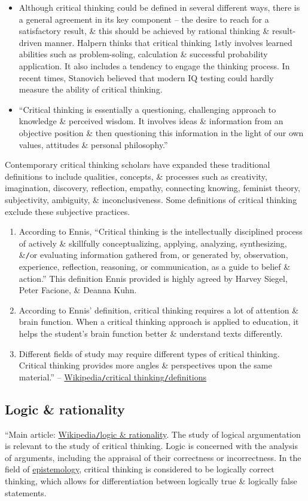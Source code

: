 \documentclass[oneside]{book}
\numberwithin{equation}{section}
\begin{document}
\begin{itemize}
	\item Although critical thinking could be defined in several different ways, there is a general agreement in its key component -- the desire to reach for a satisfactory result, \&  this should be achieved by rational thinking \& result-driven manner. Halpern thinks that critical thinking 1stly involves learned abilities such as problem-soling, calculation \& successful probability application. It also includes a tendency to engage the thinking process. In recent times, Stanovich believed that modern IQ testing could hardly measure the ability of critical thinking.
	\item ``Critical thinking is essentially a questioning, challenging approach to knowledge \& perceived wisdom. It involves ideas \& information from an objective position \& then questioning this information in the light of our own values, attitudes \& personal philosophy.''
\end{itemize}
Contemporary critical thinking scholars have expanded these traditional definitions to include qualities, concepts, \& processes such as creativity, imagination, discovery, reflection, empathy, connecting knowing, feminist theory, subjectivity, ambiguity, \& inconclusiveness. Some definitions of critical thinking exclude these subjective practices.
\begin{enumerate}
	\item According to Ennis, ``Critical thinking is the intellectually disciplined process of actively \& skillfully conceptualizing, applying, analyzing, synthesizing, \&\texttt{/}or evaluating information gathered from, or generated by, observation, experience, reflection, reasoning, or communication, as a guide to belief \& action.'' This definition Ennis provided is highly agreed by Harvey Siegel, Peter Facione, \& Deanna Kuhn.
	\item According to Ennis' definition, critical thinking requires a lot of attention \& brain function. When a critical thinking approach is applied to education, it helps the student's brain function better \& understand texts differently.
	\item Different fields of study may require different types of critical thinking. Critical thinking provides more angles \& perspectives upon the same material.'' -- \href{https://en.wikipedia.org/wiki/Critical_thinking#Definitions}{Wikipedia\texttt{/}critical thinking\texttt{/}definitions}
\end{enumerate}

\subsection{Logic \& rationality}
``Main article: \href{https://en.wikipedia.org/wiki/Logic_and_rationality}{Wikipedia\texttt{/}logic \& rationality}. The study of logical argumentation is relevant to the study of critical thinking. Logic is concerned with the analysis of arguments, including the appraisal of their correctness or incorrectness. In the field of \href{https://en.wikipedia.org/wiki/Epistemology}{epistemology}, critical thinking is considered to be logically correct thinking, which allows for differentiation between logically true \& logically false statements.
\end{document}
